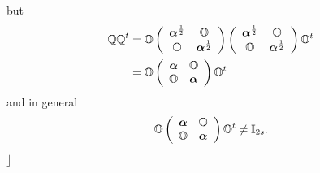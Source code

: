 \documentclass[aps,preprint]{revtex4}%
\begin{document}
but%
\begin{align}
\mathbb{QQ}^{t}  &  =\mathbb{O}\left(
\begin{array}
[c]{cc}%
\boldsymbol{\alpha}^{\frac{1}{2}} & \mathbb{O}\\
\mathbb{O} & \boldsymbol{\alpha}^{\frac{1}{2}}%
\end{array}
\right)  \left(
\begin{array}
[c]{cc}%
\boldsymbol{\alpha}^{\frac{1}{2}} & \mathbb{O}\\
\mathbb{O} & \boldsymbol{\alpha}^{\frac{1}{2}}%
\end{array}
\right)  \mathbb{O}^{t}\\
&  =\mathbb{O}\left(
\begin{array}
[c]{cc}%
\boldsymbol{\alpha} & \mathbb{O}\\
\mathbb{O} & \boldsymbol{\alpha}%
\end{array}
\right)  \mathbb{O}^{t}%
\end{align}
and in general
\begin{equation}
\mathbb{O}\left(
\begin{array}
[c]{cc}%
\boldsymbol{\alpha} & \mathbb{O}\\
\mathbb{O} & \boldsymbol{\alpha}%
\end{array}
\right)  \mathbb{O}^{t}\neq\mathbb{I}_{2s}.
\end{equation}
$\rfloor$
\end{document}
